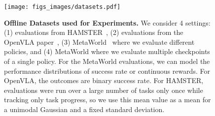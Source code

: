 \begin{figure}[!t]
    \centering
    \texttt{[image: figs\_images/datasets.pdf]}
    \caption{\textbf{Offline Datasets used for Experiments.} We consider 4 settings: (1) evaluations from HAMSTER~\cite{li2025hamster}, (2) evaluations from the OpenVLA paper~\cite{kim24openvla}, (3) MetaWorld~\cite{yu2020meta} where we evaluate different policies, and (4) MetaWorld where we evaluate multiple checkpoints of a single policy. For the MetaWorld evaluations, we can model the performance distributions of success rate or continuous rewards. For OpenVLA, the outcomes are binary success rate. For HAMSTER, evaluations were run over a large number of tasks only once while tracking only task progress, so we use this mean value as a mean for a unimodal Gaussian and a fixed standard deviation.
    }
    \label{fig:datasets}
\end{figure}

